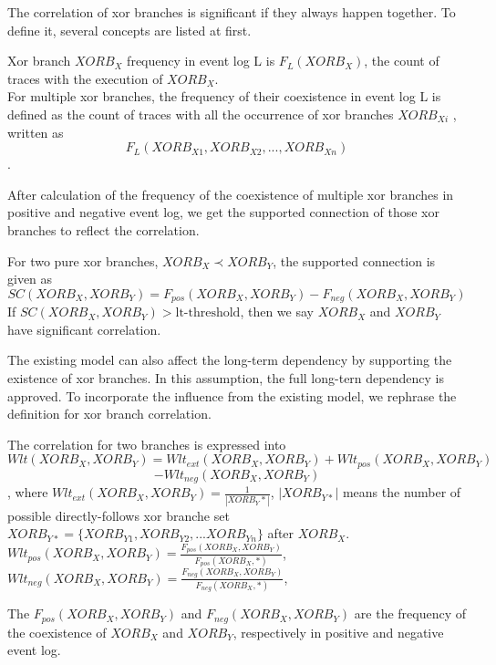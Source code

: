 The correlation of xor branches is significant if they always happen together. To define it, several concepts are listed at first. 
\begin{definition}
	Xor branch $XORB_X$ frequency in event log L is $F_{L}(XORB_X)$, the count of traces with the execution of $XORB_X$. \\
	For multiple xor branches, the frequency of their coexistence in event log L is defined as the count of traces with all the occurrence of xor branches $XORB_{Xi}$ , written as \[F_{L}(XORB_{X1}, XORB_{X2},...,XORB_{Xn})\].
\end{definition}
After calculation of the frequency of the coexistence of multiple xor branches in positive and negative event log, we get the supported connection of those xor branches to reflect the correlation. 
\begin{definition}
	\label{def: supported-connection}
	For two pure xor branches, $XORB_X \prec XORB_Y$, the supported connection is given as \[SC(XORB_X,XORB_Y)= F_{pos}(XORB_X, XORB_Y) -F_{neg}(XORB_X, XORB_Y)\]If $SC(XORB_X,XORB_Y) > \text{lt-threshold}$, then we say $XORB_X$ and $XORB_Y$ have significant correlation.
\end{definition}
The existing model can also affect the long-term dependency by supporting the existence of xor branches. In this assumption, the full long-tern dependency is approved. To incorporate the influence from the existing model, we rephrase the definition for xor branch correlation.
\begin{definition} The correlation for two branches is expressed into
	\[Wlt(XORB_X,XORB_Y)= Wlt_{ext}(XORB_X, XORB_Y) + Wlt_{pos}(XORB_X, XORB_Y)\] \[ -Wlt_{neg}(XORB_X, XORB_Y)\], where 
	$Wlt_{ext}(XORB_X, XORB_Y)= \frac{1}{|XORB_Y*|}$, $|XORB_{Y*}|$ means the number of possible  directly-follows xor branche set $XORB_{Y*}=\{XORB_{Y1}, XORB_{Y2},...XORB_{Yn} \}$ after $XORB_X$. \\ 
	$Wlt_{pos}(XORB_X, XORB_Y)= \frac{F_{pos}(XORB_X, XORB_Y)}{F_{pos}(XORB_X, *)}$, \\
	$Wlt_{neg}(XORB_X, XORB_Y)= \frac{F_{neg}(XORB_X, XORB_Y)}{F_{neg}(XORB_X, *)}$, \\	
\end{definition}
The $F_{pos}(XORB_X, XORB_Y)$ and $F_{neg}(XORB_X, XORB_Y)$ are the frequency of the coexistence of $XORB_X$ and $XORB_Y$, respectively in positive and negative event log.

